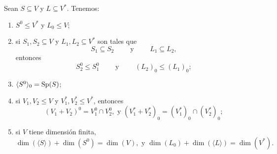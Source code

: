 \begin{pro}
Sean $S\subseteq V$ y $L\subseteq V^*$. Tenemos:
\begin{enumerate}
\item $S^0\le V^*$ y $L_0\le V$;
\item si $S_1,S_2\subseteq V$ y $L_1,L_2\subseteq V^*$ son tales que
\[
S_1\subseteq S_2\qquad\textrm{ y }\qquad L_1\subseteq L_2,
\]
entonces
\[
S_2^0\le S_1^0\qquad\textrm{ y }\qquad \left(L_2\right)_0\le\left(L_1\right)_0;
\]
\item $\langle S^0\rangle_0=\operatorname{Sp}(S)$;
\item si $V_1,V_2\le V$ y $V_1^*,V_2^*\le V^*$, entonces
\[
\left(V_1+V_2\right)^0=V_1^0\cap V_2^0,\textrm{ y } \left(V_1^*+V_2^*\right)_0=\left(V_1^*\right)_0\cap \left(V_2^*\right)_0;
\]
\item si $V$ tiene dimensi\'on finita,
\[
\dim\left(\langle S\rangle\right)+\dim(S^0)=\dim(V),\textrm{ y } \dim(L_0)+\dim\left(\langle L\rangle\right)=\dim(V^*).
\]
\end{enumerate}
\end{pro}

